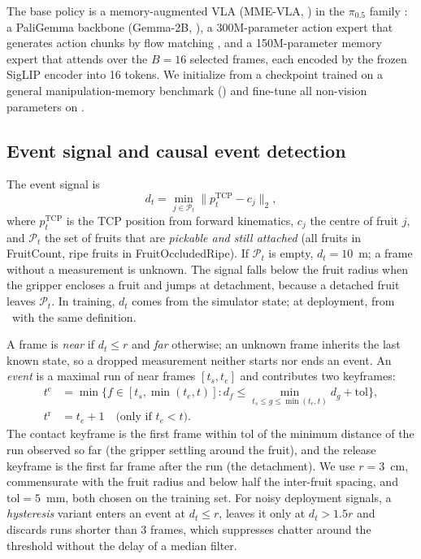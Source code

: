The base policy is a memory-augmented VLA (MME-VLA, ) in the $\pi_{0.5}$ family \citep{pi05_2025}: a PaliGemma backbone (Gemma-2B, \citealp{beyer2024paligemma}), a 300M-parameter action expert that generates action chunks by flow matching \citep{lipman2023flow}, and a 150M-parameter memory expert that attends over the $B=16$ selected frames, each encoded by the frozen SigLIP encoder \citep{zhai2023siglip} into 16 tokens. We initialize from a checkpoint trained on a general manipulation-memory benchmark () and fine-tune all non-vision parameters on \bench.

\subsection{Event signal and causal event detection}
\label{sec:signal}
\label{sec:events}
The event signal is
\begin{equation}
d_t = \min_{j \in \mathcal{P}_t} \lVert p^{\mathrm{TCP}}_t - c_j \rVert_2,
\label{eq:signal}
\end{equation}
where $p^{\mathrm{TCP}}_t$ is the TCP position from forward kinematics, $c_j$ the centre of fruit $j$, and $\mathcal{P}_t$ the set of fruits that are \emph{pickable and still attached} (all fruits in FruitCount, ripe fruits in FruitOccludedRipe). If $\mathcal{P}_t$ is empty, $d_t = 10$~m; a frame without a measurement is unknown. The signal falls below the fruit radius when the gripper encloses a fruit and jumps at detachment, because a detached fruit leaves $\mathcal{P}_t$. In training, $d_t$ comes from the simulator state; at deployment, from \fdm\ with the same definition.

A frame is \emph{near} if $d_t \le r$ and \emph{far} otherwise; an unknown frame inherits the last known state, so a dropped measurement neither starts nor ends an event. An \emph{event} is a maximal run of near frames $[t_s, t_e]$ and contributes two keyframes:
\begin{align}
t^{\mathrm{c}} &= \min\Big\{ f \in [t_s, \min(t_e, t)] : d_f \le \min_{t_s \le g \le \min(t_e,t)} d_g + \mathrm{tol} \Big\}, \label{eq:contact}\\
t^{\mathrm{r}} &= t_e + 1 \quad \text{(only if } t_e < t\text{)}. \label{eq:release}
\end{align}
The contact keyframe is the first frame within $\mathrm{tol}$ of the minimum distance of the run observed so far (the gripper settling around the fruit), and the release keyframe is the first far frame after the run (the detachment). We use $r=3$~cm, commensurate with the fruit radius and below half the inter-fruit spacing, and $\mathrm{tol}=5$~mm, both chosen on the training set. For noisy deployment signals, a \emph{hysteresis} variant enters an event at $d_t \le r$, leaves it only at $d_t > 1.5r$ and discards runs shorter than 3 frames, which suppresses chatter around the threshold without the delay of a median filter.

